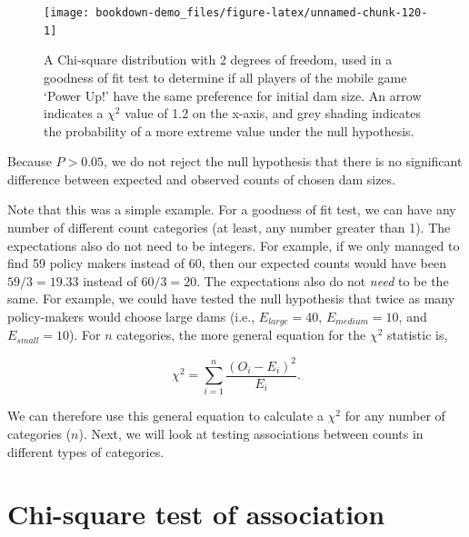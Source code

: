 \documentclass[
  openany]{krantz}
\begin{document}
\begin{figure}
\texttt{[image: bookdown-demo\_files/figure-latex/unnamed-chunk-120-1]} \caption{A Chi-square distribution with 2 degrees of freedom, used in a goodness of fit test to determine if all players of the mobile game `Power Up!' have the same preference for initial dam size. An arrow indicates a $\chi^{2}$ value of 1.2 on the x-axis, and grey shading indicates the probability of a more extreme value under the null hypothesis.}\label{fig:unnamed-chunk-120}
\end{figure}

Because \(P > 0.05\), we do not reject the null hypothesis that there is no significant difference between expected and observed counts of chosen dam sizes.

Note that this was a simple example.
For a goodness of fit test, we can have any number of different count categories (at least, any number greater than 1).
The expectations also do not need to be integers.
For example, if we only managed to find 59 policy makers instead of 60, then our expected counts would have been \(59/3 = 19.33\) instead of \(60/3 = 20\).
The expectations also do not \emph{need} to be the same.
For example, we could have tested the null hypothesis that twice as many policy-makers would choose large dams (i.e., \(E_{large} = 40\), \(E_{medium} = 10\), and \(E_{small} = 10\)).
For \(n\) categories, the more general equation for the \(\chi^{2}\) statistic is,

\[\chi^{2} = \sum_{i = 1}^{n} \frac{\left(O_{i} - E_{i}\right)^{2}}{E_{i}}.\]

We can therefore use this general equation to calculate a \(\chi^{2}\) for any number of categories (\(n\)).
Next, we will look at testing associations between counts in different types of categories.

\hypertarget{chi-square-test-of-association}{%
\section{Chi-square test of association}\label{chi-square-test-of-association}}
\end{document}
